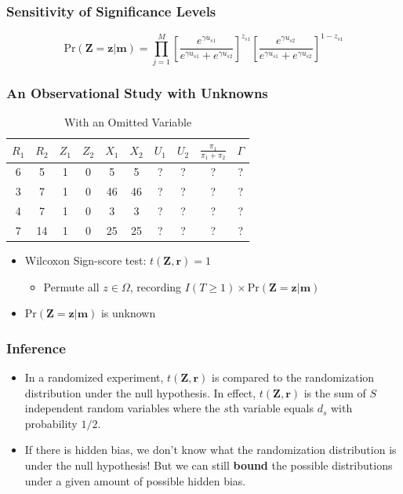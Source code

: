 \documentclass{beamer}
\begin{document}
\begin{frame}[c]\frametitle{Sensitivity of Significance Levels}
	
	\[
	\textrm{Pr}(\mathbf{Z=z|m}) = \prod_{j=1}^M \left [\frac{e^{\gamma u_{s1}}}{e^{\gamma u_{s1}}+e^{\gamma u_{s2}}}\right ]^{z_{s1}} \left [\frac{e^{\gamma u_{s2}}}{e^{\gamma u_{s1}}+e^{\gamma u_{s2}}}\right ]^{1-z_{s1}} 
	\]
	
\end{frame}




\begin{frame}[c]\frametitle{An Observational Study with Unknowns}
	\begin{table}
		\begin{center}
			\begin{tabular}{cccccccccc}
				$R_1$ & $R_2$ & $Z_1$ & $Z_2$ & $X_1$ & $X_2$ & $U_1$ & $U_2$ & $\frac{\pi_1}{\pi_1 + \pi_2}$ & $\Gamma $\\ \hline
				6 & 5 & 1 & 0 & 5 & 5 & ? & ? &  ? &? \\
				3 & 7 & 1 & 0 & 46 & 46 & ? & ? & ? &? \\
				4 & 7 & 1 & 0 & 3 & 3 & ? & ? &  ? & ?\\
				7 & 14 & 1 & 0 & 25 &25 & ? & ? & ? & ? \\
			\end{tabular}
		\end{center}
		\caption{With an Omitted Variable}
	\end{table}
\begin{itemize}
\item[] Wilcoxon Sign-score test: $t(\mathbf{Z},\mathbf{r}) = 1$
\begin{itemize}
\item Permute all $z\in\Omega$, recording $I(T\geq
  1)\times\text{Pr}(\mathbf{Z}=\mathbf{z}|\mathbf{m})$
\end{itemize}
\vspace{.25em}
\item[] $\text{Pr}(\mathbf{Z}=\mathbf{z}|\mathbf{m})$ is unknown

\end{itemize}
\end{frame}




  \begin{frame}
    \frametitle{Inference}
    \begin{itemize}
    \item In a randomized experiment, $t(\mathbf{Z},\mathbf{r})$ is
      compared to the randomization distribution under the null
      hypothesis. In effect, $t(\mathbf{Z},\mathbf{r})$ is the sum of
      $S$ independent random variables where the $s$th variable equals
      $d_s$ with probability $1/2$.
    \item If there is hidden bias, we don't know what the
      randomization distribution is under the null hypothesis! But we
      can still \textbf{bound} the possible distributions under a
      given amount of possible hidden bias.
\end{itemize}
  \end{frame}
\end{document}
